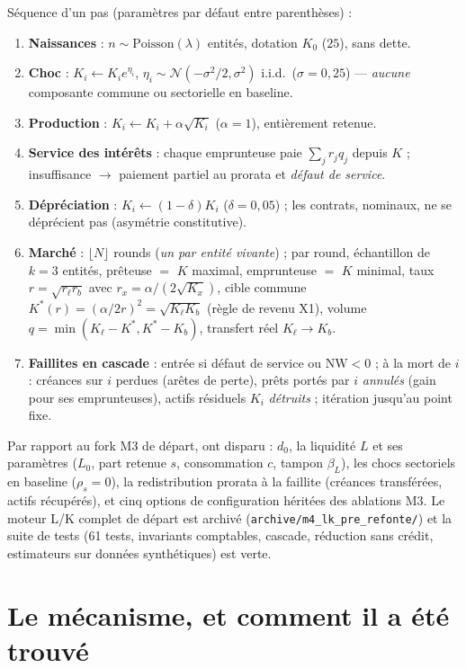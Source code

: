 \documentclass[11pt,a4paper]{article}
\newcommand{\NW}{\mathrm{NW}}
\newcommand{\code}[1]{\texttt{#1}}
\begin{document}
Séquence d'un pas (paramètres par défaut entre parenthèses) :
\begin{enumerate}[nosep]
\item \textbf{Naissances} : $n \sim \text{Poisson}(\lambda)$ entités, dotation
  $K_0$ ($25$), sans dette.
\item \textbf{Choc} : $K_i \gets K_i e^{\eta_i}$,
  $\eta_i \sim \mathcal{N}(-\sigma^2/2, \sigma^2)$ i.i.d.\ ($\sigma = 0{,}25$)
  --- \emph{aucune} composante commune ou sectorielle en baseline.
\item \textbf{Production} : $K_i \gets K_i + \alpha\sqrt{K_i}$ ($\alpha = 1$),
  entièrement retenue.
\item \textbf{Service des intérêts} : chaque emprunteuse paie
  $\sum_j r_j q_j$ depuis $K$ ; insuffisance $\to$ paiement partiel au
  prorata et \emph{défaut de service}.
\item \textbf{Dépréciation} : $K_i \gets (1-\delta) K_i$ ($\delta = 0{,}05$) ;
  les contrats, nominaux, ne se déprécient pas (asymétrie constitutive).
\item \textbf{Marché} : $\lfloor N \rfloor$ rounds (\emph{un par entité
  vivante}) ; par round, échantillon de $k = 3$ entités, prêteuse $=$ $K$
  maximal, emprunteuse $=$ $K$ minimal, taux $r = \sqrt{r_\ell r_b}$ avec
  $r_x = \alpha/(2\sqrt{K_x})$, cible commune $K^*(r) = (\alpha/2r)^2 =
  \sqrt{K_\ell K_b}$ (règle de revenu X1), volume
  $q = \min(K_\ell - K^*, K^* - K_b)$, transfert réel $K_\ell \to K_b$.
\item \textbf{Faillites en cascade} : entrée si défaut de service ou
  $\NW < 0$ ; à la mort de $i$ : créances sur $i$ perdues (arêtes de perte),
  prêts portés par $i$ \emph{annulés} (gain pour ses emprunteuses), actifs
  résiduels $K_i$ \emph{détruits} ; itération jusqu'au point fixe.
\end{enumerate}

Par rapport au fork M3 de départ, ont disparu : $d_0$, la liquidité $L$ et
ses paramètres ($L_0$, part retenue $s$, consommation $c$, tampon
$\beta_L$), les chocs sectoriels en baseline ($\rho_s = 0$), la
redistribution prorata à la faillite (créances transférées, actifs
récupérés), et cinq options de configuration héritées des ablations M3. Le
moteur L/K complet de départ est archivé
(\code{archive/m4\_lk\_pre\_refonte/}) et la suite de tests (61 tests,
invariants comptables, cascade, réduction sans crédit, estimateurs sur
données synthétiques) est verte.

\section{Le mécanisme, et comment il a été trouvé}
\end{document}
